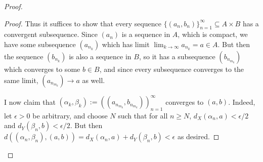 \documentclass[12pt, a4paper]{book}
\theoremstyle{nonumberplain}
\newtheorem{proof}{Proof}
\begin{document}
\begin{proof}
\begin{proof}
    Thus it suffices to show that every sequence $\{(a_n,b_n)\}_{n=1}^\infty\subseteq A\times B$
    has a convergent subsequence. Since $(a_n)$ is a sequence in $A$, which is compact, we have some
    subsequence $(a_{n_k})$ which has limit $\lim_{k\to\infty}a_{n_k}=a\in A$. But then
    the sequence $(b_{n_k})$ is also a sequence in $B$, so it has a subsequence $(b_{n_{m_k}})$ which
    converges to some $b\in B$, and since every subsequence converges to the same limit, $(a_{n_{m_k}})\to a$
    as well.

    I now claim that $(\alpha_k,\beta_k):=((a_{n_{m_k}},b_{n_{m_k}}))_{n=1}^\infty$ converges to $(a,b)$.
    Indeed, let $\epsilon>0$ be arbitrary, and choose $N$ such that for all $n\geq N$, $d_X(\alpha_n,a)<\epsilon/2$
    and $d_Y(\beta_n,b)<\epsilon/2$. But then $d( (\alpha_n,\beta_n),(a,b) )= d_X(\alpha_n,a)+d_Y(\beta_n,b)<\epsilon$
    as desired.
\end{proof}


\end{proof}
\end{document}

